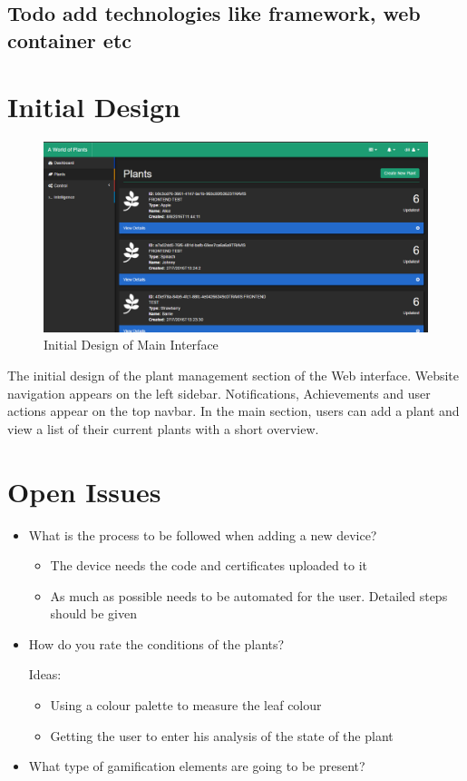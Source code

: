 \documentclass{article}
\begin{document}
\subsection{Todo add technologies like framework, web container etc}

\section{Initial Design}
\begin{figure}[H]
 	\includegraphics[width=\textwidth]{images/initial-design.png}
  	\caption{Initial Design of Main Interface}
\end{figure}

The initial design of the plant management section of the Web interface. Website navigation appears on the left sidebar. Notifications, Achievements and user actions appear on the top navbar. In the main section, users can add a plant and view a list of their current plants with a short overview.

\section{Open Issues}
\begin{itemize}
	\item What is the process to be followed when adding a new device?
	
	\begin{itemize}
		\item The device needs the code and certificates uploaded to it
		\item As much as possible needs to be automated for the user. Detailed steps should be given
	\end{itemize}

	\item How do you rate the conditions of the plants?
	
	Ideas:
	\begin{itemize}
		\item Using a colour palette to measure the leaf colour
		\item Getting the user to enter his analysis of the state of the plant
	\end{itemize}
	
	\item What type of gamification elements are going to be present?
\end{itemize}
\end{document}
